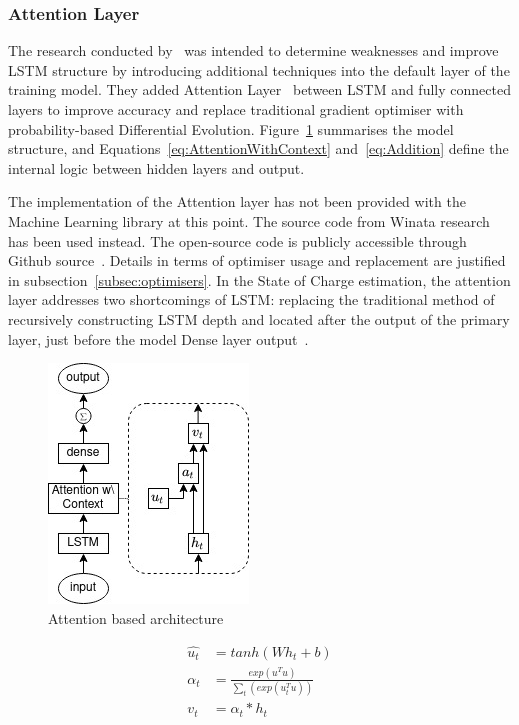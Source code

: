 \subsubsection{Attention Layer}
The research conducted by~\cite{mamo_long_2020} was intended to determine weaknesses and improve LSTM structure by introducing additional techniques into the default layer of the training model. 
They added Attention Layer~\cite{yang_hierarchical_2016} between LSTM and fully connected layers to improve accuracy and replace traditional gradient optimiser with probability-based Differential Evolution.
\mbox{Figure~\ref{fig:attention}} summarises the model structure, and \mbox{Equations~\ref{eq:AttentionWithContext}} and~\ref{eq:Addition} define the internal logic between hidden layers and output.

%
The implementation of the Attention layer has not been provided with the Machine Learning library at this point.
The source code from Winata research~\cite{winata_attention-based_2018} has been used instead.
The open-source code is publicly accessible through Github source~\cite{attention_8461990}.
Details in terms of optimiser usage and replacement are justified in subsection~\ref{subsec:optimisers}.
In the State of Charge estimation, the attention layer addresses two shortcomings of LSTM: replacing the traditional method of recursively constructing LSTM depth and located after the output of the primary layer, just before the model Dense layer output~\cite{mamo_long_2020}.
\begin{figure}[htbp]
    \centering
    \includegraphics[width=0.35\linewidth]{II_Body/LSTM/images/AttenrionDrawing.jpg}
    \caption{Attention based architecture}
    \label{fig:attention}
\end{figure}
\begin{equation}
    \begin{split}
        \hat{u_t} &= tanh \left(W h_{t} + b \right) \\
             \alpha_t &= \frac{exp(u^T u)}{\sum_t(exp(u_t^T u))} \\
              v_t &= \alpha_t*h_t%
    \end{split}
    \label{eq:AttentionWithContext}
\end{equation}
